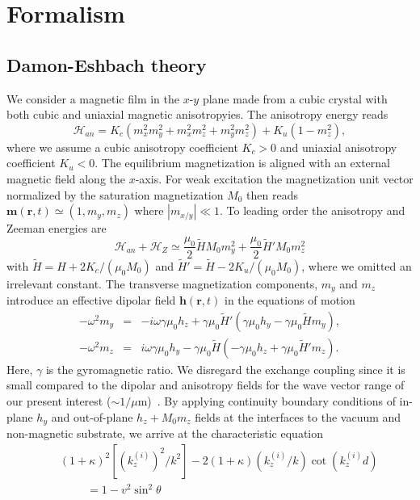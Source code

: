 \documentclass[aps,prb,twocolumn,superscriptaddress,floatfix]{revtex4}%
\begin{document}
\section{Formalism}
\subsection{Damon-Eshbach theory}
We consider a magnetic film in the $x$-$y$ plane made from a cubic crystal with both cubic and uniaxial magnetic anisotropyies. The anisotropy energy reads
\begin{equation}
\mathcal {H}_{an}=K_c (m_x^2 m_y^2 +m_x^2 m_z^2 +m_y^2 m_z^2) +K_u (1-m_z^2),
\end{equation}
where we assume a cubic anisotropy coefficient $K_c>0$ and uniaxial anisotropy coefficient $K_u<0$. The equilibrium magnetization is aligned with an external magnetic field along the $x$-axis. For weak excitation the magnetization unit vector 
normalized by the saturation magnetization $M_0$
then reads  $\mathbf m (\mathbf r,t) \simeq(1, m_y, m_z)$ where $|m_{x/y}|\ll 1$. To leading order the anisotropy and Zeeman energies are
\begin{equation}
\mathcal{H}_{an}+\mathcal{H}_{Z} \simeq \frac{\mu_{0}}{2}{\tilde H}M_{0} m_y^2 + \frac{\mu_{0}}{2}{\tilde H}'M_{0} m_z^2 
\end{equation}
with $\tilde{H}=H+{2K_c}/({\mu_0 M_{0}})$ and $\tilde{H}'=\tilde{H}-{2K_u}/(\mu_0{M_{0}})$, where we omitted an irrelevant constant. The transverse magnetization components, $m_y$ and $m_z$ introduce an effective dipolar
field $\mathbf h (\mathbf r,t)$ in the equations of motion~\cite{Damon1961,Hurben96}
\begin{eqnarray}
-\omega^{2}m_{y}&=&-i\omega\gamma \mu_0 h_{z}+\gamma \mu_0 \tilde{H}'(\gamma \mu_{0}h_{y}-\gamma \mu_0 \tilde{H}m_{y}), \label{EOM_M} \\
-\omega^{2}m_{z}&=&i\omega\gamma \mu_{0}h_{y}-\gamma \mu_0\tilde{H}(-\gamma \mu_{0}h_{z}+\gamma \mu_0\tilde{H}'m_{z}). \label{EOM_Mz}
\end{eqnarray}
Here, $\gamma$ is the gyromagnetic ratio. We disregard the exchange coupling since it is small compared to the dipolar and anisotropy fields for the wave vector range of our present interest ($\sim 1/\mu$m)~\cite{Shen15,Hashimoto17}. 
 By applying continuity boundary conditions of in-plane $h_y$ and out-of-plane $h_z+M_0 m_z$ fields at the interfaces to the vacuum and non-magnetic substrate, we arrive at the characteristic equation~\cite{Damon1961,Hurben96}
\begin{eqnarray}
&&(1+\kappa)^{2}\left[(k_z^{(i)})^2/k^2\right]-2(1+\kappa)(k_z^{(i)}/k)\cot({k_{z}^{(i)}d})\nonumber \\ 
&&\hspace{1cm}=1-v^{2}\sin^{2}\theta \label{eigen_mode}
\end{eqnarray}
\end{document}
